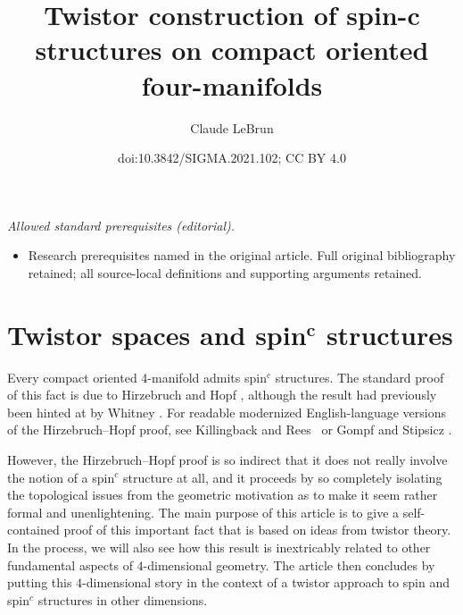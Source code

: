 \documentclass[10pt,a4paper]{amsart}
\title{Twistor construction of spin-c structures on compact oriented four-manifolds}
\author{Claude LeBrun}
\date{doi:10.3842/SIGMA.2021.102; CC BY 4.0}
\numberwithin{equation}{section}
\begin{document}
\maketitle
\noindent\textit{Allowed standard prerequisites (editorial).}\begin{itemize}
\item Research prerequisites named in the original article. Full original bibliography retained; all source-local definitions and supporting arguments retained.
\end{itemize}\medskip
 \section[Twistor spaces and spin c structures]{Twistor spaces and spin$\boldsymbol{{}^c}$ structures}

 Every compact oriented 4-manifold admits spin$^c$ structures. The standard proof of this fact is due to Hirzebruch and Hopf \cite{hiho},
 although the result had previously been hinted at by Whitney \cite{whitney}. For readable modernized English-language versions
 of the Hirzebruch--Hopf proof, see Killingback and Rees~\cite{krees} or Gompf and Stipsicz \cite[Section~5.7]{gost}.

 However, the Hirzebruch--Hopf proof is so indirect that it does not really involve the notion of a spin$^c$ structure at all, and it
 proceeds by so completely isolating
 the topological issues from
 the geometric motivation as to make it seem rather formal and
 unenlightening. The main purpose of this article is to give a self-contained
 proof of this important fact that is based on ideas from twistor theory. In the process, we will also see how this result is inextricably related to other fundamental aspects of $4$-dimensional geometry. The article then concludes by putting this $4$-dimensional story in the context of a twistor approach to spin and spin$^c$ structures in other dimensions.
\end{document}
